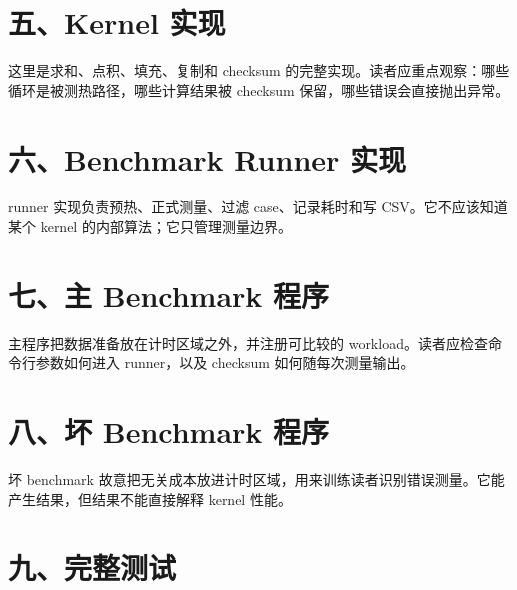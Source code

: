 

\section{五、Kernel 实现}

这里是求和、点积、填充、复制和 checksum 的完整实现。读者应重点观察：哪些循环是被测热路径，哪些计算结果被 checksum 保留，哪些错误会直接抛出异常。



\section{六、Benchmark Runner 实现}

runner 实现负责预热、正式测量、过滤 case、记录耗时和写 CSV。它不应该知道某个 kernel 的内部算法；它只管理测量边界。



\section{七、主 Benchmark 程序}

主程序把数据准备放在计时区域之外，并注册可比较的 workload。读者应检查命令行参数如何进入 runner，以及 checksum 如何随每次测量输出。



\section{八、坏 Benchmark 程序}

坏 benchmark 故意把无关成本放进计时区域，用来训练读者识别错误测量。它能产生结果，但结果不能直接解释 kernel 性能。



\section{九、完整测试}

